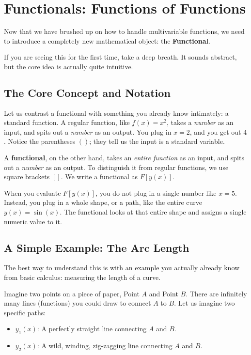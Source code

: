 \section{Functionals: Functions of Functions}
Now that we have brushed up on how to handle multivariable functions, we need to introduce a completely new mathematical object: the \textbf{Functional}. 

If you are seeing this for the first time, take a deep breath. It sounds abstract, but the core idea is actually quite intuitive. 

\subsection*{The Core Concept and Notation}
Let us contrast a functional with something you already know intimately: a standard function. 
A regular function, like $f(x) = x^2$, takes a \textit{number} as an input, and spits out a \textit{number} as an output. You plug in $x=2$, and you get out $4$. Notice the parentheses $()$; they tell us the input is a standard variable.

A \textbf{functional}, on the other hand, takes an \textit{entire function} as an input, and spits out a \textit{number} as an output. 
To distinguish it from regular functions, we use square brackets $[]$. We write a functional as $F[y(x)]$. 

When you evaluate $F[y(x)]$, you do not plug in a single number like $x=5$. Instead, you plug in a whole shape, or a path, like the entire curve $y(x) = \sin(x)$. The functional looks at that entire shape and assigns a single numeric value to it. 

\subsection*{A Simple Example: The Arc Length}
The best way to understand this is with an example you actually already know from basic calculus: measuring the length of a curve.

Imagine two points on a piece of paper, Point $A$ and Point $B$. There are infinitely many lines (functions) you could draw to connect $A$ to $B$. 
Let us imagine two specific paths:
\begin{itemize}
    \item $y_1(x)$: A perfectly straight line connecting $A$ and $B$.
    \item $y_2(x)$: A wild, winding, zig-zagging line connecting $A$ and $B$.
\end{itemize}


